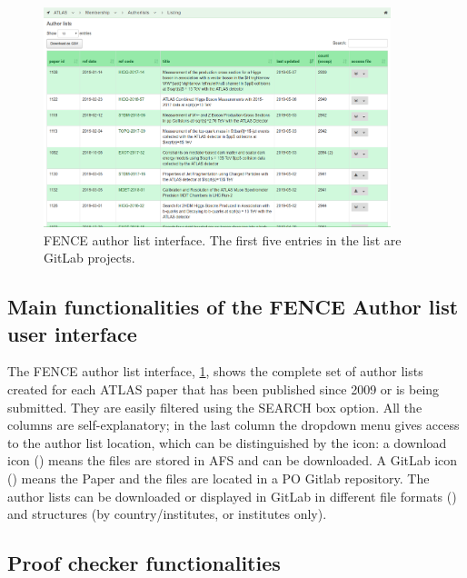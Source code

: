 \begin{figure}[htb]
  \centering
  \includegraphics[width=0.9\textwidth]{figures/authorlist_interface.png}%
  \caption{FENCE author list interface.
    The first five entries in the list are GitLab projects.}%
  \label{fig:authorlist_interface}
\end{figure}

\subsection{Main functionalities of the FENCE Author list user interface}
\label{sec:Main_functionalities_of_the_FENCE_Author_list_user_interface}

The FENCE author list interface, \cref{fig:authorlist_interface}, shows the complete set of author lists created for each ATLAS paper that has been published since 2009 or is being submitted.
They are easily filtered using the SEARCH box option.
All the columns are self-explanatory; in the last column the dropdown menu gives access to the author list location, which can be distinguished by the icon:
a download icon (\faDownload) means the files are stored in AFS and can be downloaded.
A GitLab icon (\faGitlab) means the Paper and the files are located in a PO Gitlab repository. The author lists can be downloaded or displayed in GitLab in different file formats () and structures (by country/institutes, or institutes only). 

\subsection{Proof checker functionalities}
\label{sec:Proof_checker_functionalities}

